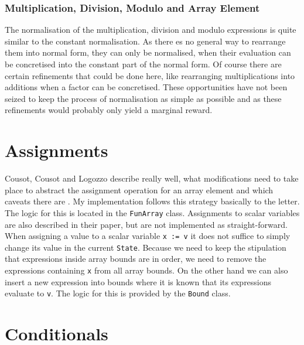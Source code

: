 \subsubsection{Multiplication, Division, Modulo and Array Element}

The normalisation of the multiplication, division and modulo expressions is quite similar to the constant normalisation. As there es no general way to rearrange them into normal form, they can only be normalised, when their evaluation can be concretised into the constant part of the normal form. Of course there are certain refinements that could be done here, like rearranging multiplications into additions when a factor can be concretised. These opportunities have not been seized to keep the process of normalisation as simple as possible and as these refinements would probably only yield a marginal reward. 








\section{Assignments}

Cousot, Cousot and Logozzo describe really well, what modifications need to take place to abstract the assignment operation for an array element and which caveats there are \cite[section 11.6]{cousot2011}. My implementation follows this strategy basically to the letter. The logic for this is located in the \texttt{FunArray} class. 
Assignments to scalar variables are also described in their paper, but are not implemented as straight-forward. When assigning a value to a scalar variable \texttt{x := v} it does not suffice to simply change its value in the current \texttt{State}. Because we need to keep the stipulation that expressions inside array bounds are in order, we need to remove the expressions containing \texttt{x} from all array bounds. On the other hand we can also insert a new expression into bounds where it is known that its expressions evaluate to \texttt{v}. The logic for this is provided by the \texttt{Bound} class.





\section{Conditionals}\label{sec:conditions}

